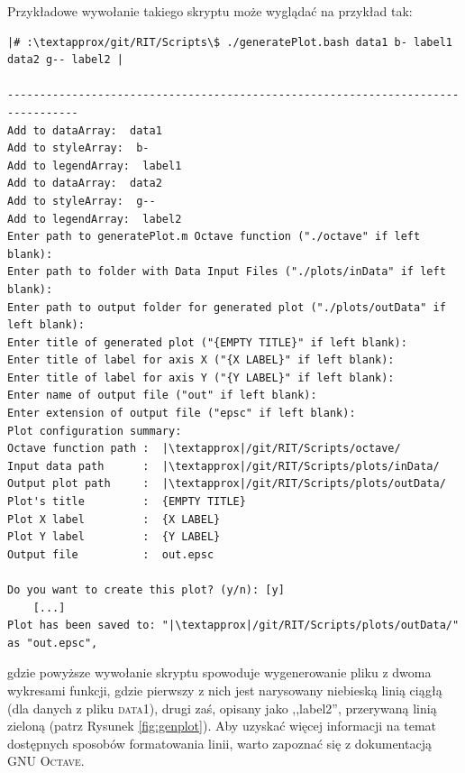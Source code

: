 
Przykładowe wywołanie takiego skryptu może wyglądać na przykład tak:

\begin{verbatim}
|# :\textapprox/git/RIT/Scripts\$ ./generatePlot.bash data1 b- label1 data2 g-- label2 |

---------------------------------------------------------------------------------
Add to dataArray:  data1
Add to styleArray:  b-
Add to legendArray:  label1
Add to dataArray:  data2
Add to styleArray:  g--
Add to legendArray:  label2
Enter path to generatePlot.m Octave function ("./octave" if left blank): 
Enter path to folder with Data Input Files ("./plots/inData" if left blank): 
Enter path to output folder for generated plot ("./plots/outData" if left blank): 
Enter title of generated plot ("{EMPTY TITLE}" if left blank): 
Enter title of label for axis X ("{X LABEL}" if left blank): 
Enter title of label for axis Y ("{Y LABEL}" if left blank): 
Enter name of output file ("out" if left blank): 
Enter extension of output file ("epsc" if left blank): 
Plot configuration summary: 
Octave function path :	|\textapprox|/git/RIT/Scripts/octave/
Input data path      :	|\textapprox|/git/RIT/Scripts/plots/inData/
Output plot path     :	|\textapprox|/git/RIT/Scripts/plots/outData/
Plot's title         :	{EMPTY TITLE}
Plot X label         :	{X LABEL}
Plot Y label         :	{Y LABEL}
Output file          :	out.epsc

Do you want to create this plot? (y/n): [y]
	[...]
Plot has been saved to: "|\textapprox|/git/RIT/Scripts/plots/outData/" as "out.epsc",
\end{verbatim}
gdzie powyższe wywołanie skryptu spowoduje wygenerowanie pliku z dwoma wykresami funkcji, gdzie pierwszy z nich jest narysowany niebieską linią ciągłą (dla danych z pliku \textsc{data1}), drugi zaś, opisany jako ,,label2'',  przerywaną linią zieloną (patrz Rysunek \ref{fig:genplot}). Aby uzyskać więcej informacji na temat dostępnych sposobów formatowania linii, warto zapoznać się z dokumentacją \textsc{GNU Octave}.

